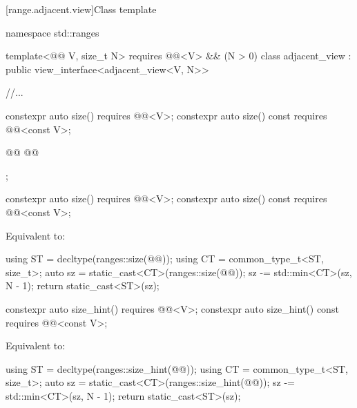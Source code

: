 \documentclass{wg21}
\begin{document}
 [range.adjacent.view]{Class template }

%
%
%
\begin{codeblock}
namespace std::ranges {
template<@@ V, size_t N>
requires @@<V> && (N > 0)
class adjacent_view : public view_interface<adjacent_view<V, N>> {
    //...

    constexpr auto size() requires @@<V>;
    constexpr auto size() const requires @@<const V>;

    @@
    @@

};
}
\end{codeblock}

\begin{itemdecl}
    constexpr auto size() requires @@<V>;
    constexpr auto size() const requires @@<const V>;
\end{itemdecl}

\begin{itemdescr}
    \pnum
    \effects
    Equivalent to:
    \begin{codeblock}
        using ST = decltype(ranges::size(@@));
        using CT = common_type_t<ST, size_t>;
        auto sz = static_cast<CT>(ranges::size(@@));
        sz -= std::min<CT>(sz, N - 1);
        return static_cast<ST>(sz);
    \end{codeblock}
\end{itemdescr}

\begin{addedblock}
\begin{itemdecl}
    constexpr auto size_hint() requires @@<V>;
    constexpr auto size_hint() const requires @@<const V>;
\end{itemdecl}

\begin{itemdescr}
\pnum
\effects
Equivalent to:
\begin{codeblock}
    using ST = decltype(ranges::size_hint(@@));
    using CT = common_type_t<ST, size_t>;
    auto sz = static_cast<CT>(ranges::size_hint(@@));
    sz -= std::min<CT>(sz, N - 1);
    return static_cast<ST>(sz);
\end{codeblock}
\end{itemdescr}
\end{addedblock}
\end{document}
